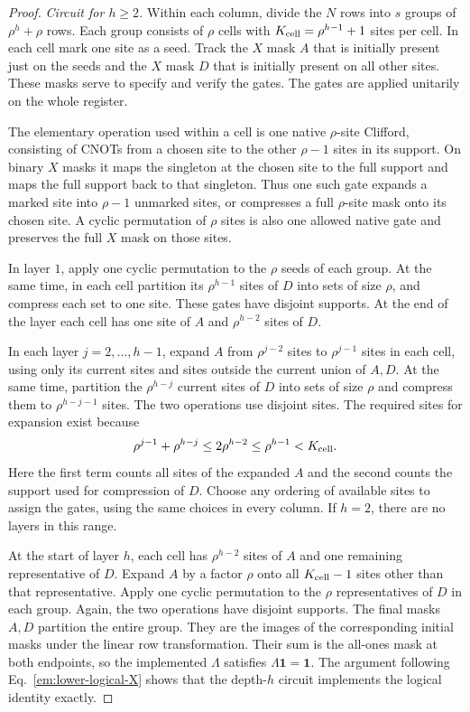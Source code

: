 \documentclass[aps,prl,reprint,notitlepage,nofootinbib,nobibnotes]{revtex4-2}
\begin{document}
\begin{proof}
\emph{Circuit for \(h\ge2\).}
Within each column, divide the \(N\) rows into \(s\) groups of \(\rho^h+\rho\) rows. Each group consists of \(\rho\) cells with \(K_{\rm cell}=\rho^{h-1}+1\) sites per cell. In each cell mark one site as a seed. Track the \(X\) mask \(A\) that is initially present just on the seeds and the \(X\) mask \(D\) that is initially present on all other sites. These masks serve to specify and verify the gates. The gates are applied unitarily on the whole register.

The elementary operation used within a cell is one native \(\rho\)-site Clifford, consisting of CNOTs from a chosen site to the other \(\rho-1\) sites in its support. On binary \(X\) masks it maps the singleton at the chosen site to the full support and maps the full support back to that singleton. Thus one such gate expands a marked site into \(\rho-1\) unmarked sites, or compresses a full \(\rho\)-site mask onto its chosen site. A cyclic permutation of \(\rho\) sites is also one allowed native gate and preserves the full \(X\) mask on those sites.

In layer \(1\), apply one cyclic permutation to the \(\rho\) seeds of each group. At the same time, in each cell partition its \(\rho^{h-1}\) sites of \(D\) into sets of size \(\rho\), and compress each set to one site. These gates have disjoint supports. At the end of the layer each cell has one site of \(A\) and \(\rho^{h-2}\) sites of \(D\).

In each layer \(j=2,\ldots,h-1\), expand \(A\) from \(\rho^{j-2}\) sites to \(\rho^{j-1}\) sites in each cell, using only its current sites and sites outside the current union of \(A,D\). At the same time, partition the \(\rho^{h-j}\) current sites of \(D\) into sets of size \(\rho\) and compress them to \(\rho^{h-j-1}\) sites. The two operations use disjoint sites. The required sites for expansion exist because
\[
 \rho^{j-1}+\rho^{h-j}
 \le 2\rho^{h-2}\le\rho^{h-1}<K_{\rm cell}.
\]
Here the first term counts all sites of the expanded \(A\) and the second counts the support used for compression of \(D\). Choose any ordering of available sites to assign the gates, using the same choices in every column. If \(h=2\), there are no layers in this range.

At the start of layer \(h\), each cell has \(\rho^{h-2}\) sites of \(A\) and one remaining representative of \(D\). Expand \(A\) by a factor \(\rho\) onto all \(K_{\rm cell}-1\) sites other than that representative. Apply one cyclic permutation to the \(\rho\) representatives of \(D\) in each group. Again, the two operations have disjoint supports. The final masks \(A,D\) partition the entire group. They are the images of the corresponding initial masks under the linear row transformation. Their sum is the all-ones mask at both endpoints, so the implemented \(\Lambda\) satisfies \(\Lambda\mathbf 1=\mathbf 1\). The argument following Eq.~\eqref{em:lower-logical-X} shows that the depth-\(h\) circuit implements the logical identity exactly.


\end{proof}
\end{document}
